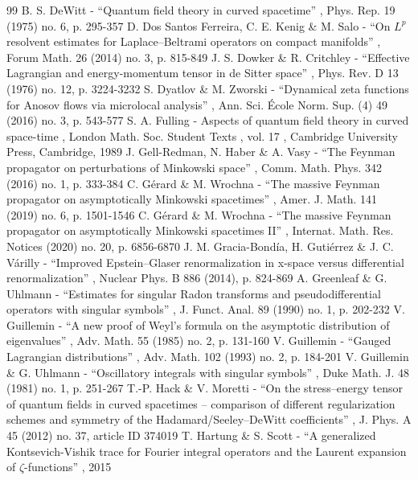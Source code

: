 \documentclass[10pt]{amsart}
\theoremstyle{definition}
\begin{document}
\begin{thebibliography}{99}
 B. S. DeWitt - “Quantum field theory in curved spacetime” , Phys. Rep. 19 (1975) no. 6, p. 295-357
 D. Dos Santos Ferreira, C. E. Kenig \& M. Salo - “On $L^p$ resolvent estimates for Laplace–Beltrami operators on compact manifolds” , Forum Math. 26 (2014) no. 3, p. 815-849
 J. S. Dowker \& R. Critchley - “Effective Lagrangian and energy-momentum tensor in de Sitter space” , Phys. Rev. D 13 (1976) no. 12, p. 3224-3232
 S. Dyatlov \& M. Zworski - “Dynamical zeta functions for Anosov flows via microlocal analysis” , Ann. Sci. École Norm. Sup. (4) 49 (2016) no. 3, p. 543-577
 S. A. Fulling - Aspects of quantum field theory in curved space-time , London Math. Soc. Student Texts , vol. 17 , Cambridge University Press, Cambridge, 1989
 J. Gell-Redman, N. Haber \& A. Vasy - “The Feynman propagator on perturbations of Minkowski space” , Comm. Math. Phys. 342 (2016) no. 1, p. 333-384
 C. Gérard \& M. Wrochna - “The massive Feynman propagator on asymptotically Minkowski spacetimes” , Amer. J. Math. 141 (2019) no. 6, p. 1501-1546
 C. Gérard \& M. Wrochna - “The massive Feynman propagator on asymptotically Minkowski spacetimes II” , Internat. Math. Res. Notices (2020) no. 20, p. 6856-6870
 J. M. Gracia-Bondía, H. Gutiérrez \& J. C. Várilly - “Improved Epstein–Glaser renormalization in x-space versus differential renormalization” , Nuclear Phys. B 886 (2014), p. 824-869
 A. Greenleaf \& G. Uhlmann - “Estimates for singular Radon transforms and pseudodifferential operators with singular symbols” , J. Funct. Anal. 89 (1990) no. 1, p. 202-232
 V. Guillemin - “A new proof of Weyl’s formula on the asymptotic distribution of eigenvalues” , Adv. Math. 55 (1985) no. 2, p. 131-160
 V. Guillemin - “Gauged Lagrangian distributions” , Adv. Math. 102 (1993) no. 2, p. 184-201
 V. Guillemin \& G. Uhlmann - “Oscillatory integrals with singular symbols” , Duke Math. J. 48 (1981) no. 1, p. 251-267
 T.-P. Hack \& V. Moretti - “On the stress–energy tensor of quantum fields in curved spacetimes – comparison of different regularization schemes and symmetry of the Hadamard/Seeley–DeWitt coefficients” , J. Phys. A 45 (2012) no. 37, article ID 374019
 T. Hartung \& S. Scott - “A generalized Kontsevich-Vishik trace for Fourier integral operators and the Laurent expansion of $\zeta $-functions” , 2015

\end{thebibliography}
\end{document}
